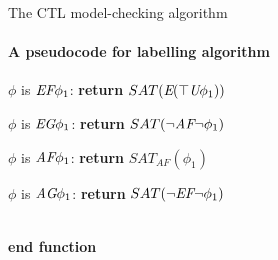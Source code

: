 \begin{frame}{The CTL model-checking algorithm}
	\framesubtitle{A pseudocode for labelling algorithm}
	\qquad  $\phi$ is $\textit{E}\textit{F} \phi_{1}$: {\bf return} $SAT(\textit{E}(\top \textit{U} \phi_{1}))$
	
	\qquad  $\phi$ is $\textit{E}\textit{G} \phi_{1}$: {\bf return} $SAT(\neg\textit{A}\textit{F}\neg \phi_{1})$
	
	\qquad  $\phi$ is $\textit{A}\textit{F} \phi_{1}$: {\bf return} $SAT_{AF}(\phi_{1})$
	
	\qquad  $\phi$ is $\textit{A}\textit{G} \phi_{1}$: {\bf return} $SAT(\neg\textit{E}\textit{F}\neg \phi_{1})$
	
	\\
	{\bf end function}
\end{frame}